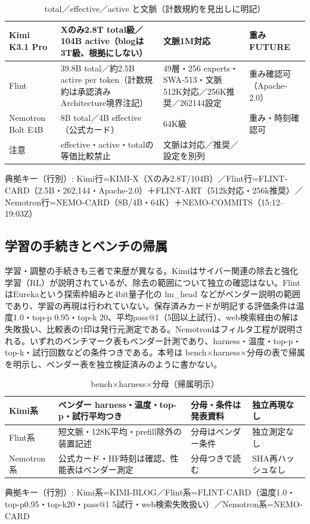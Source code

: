 \documentclass[lualatex,a4paper,10pt]{jlreq}
\begin{document}
\begin{table}[htbp]\centering\footnotesize
\caption{total／effective／active と文脈（計数規約を見出しに明記）}
\begin{tabularx}{0.96\linewidth}{@{}lXXX@{}}
\toprule
Kimi K3.1 Pro & Xのみ2.8T total級／104B active（blogは3T級、根拠にしない） & 文脈1M対応 & 重みFUTURE \\
\midrule
Flint & 39.8B total／約2.5B active per token（計数規約は承認済みArchitecture境界注記） & 49層・256 experts・SWA-513・文脈512K対応／256K推奨／262144設定 & 重み確認可（Apache-2.0） \\
Nemotron Bolt E4B & 8B total／4B effective（公式カード） & 64K級 & 重み・時刻確認可 \\
注意 & effective・active・totalの等価比較禁止 & 文脈は対応／推奨／設定を別列 &  \\
\bottomrule
\end{tabularx}
{\scriptsize\color{SurveyMuted} 典拠キー（行別）: Kimi行=KIMI-X（Xのみ2.8T/104B）／Flint行=FLINT-CARD（2.5B・262,144・Apache-2.0）＋FLINT-ART（512k対応・256k推奨）／Nemotron行=NEMO-CARD（8B/4B・64K）＋NEMO-COMMITS（15:12–19:03Z）\par}
\end{table}


\subsection*{学習の手続きとベンチの帰属}


学習・調整の手続きも三者で来歴が異なる。Kimiはサイバー関連の除去と強化学習（RL）が説明されているが、除去の範囲について独立の確認はない。FlintはEurekaという探索枠組みと4bit量子化の lm\_head などがベンダー説明の範囲であり、学習の再現は行われていない。保存済みカードが明記する評価条件は温度1.0・top-p 0.95・top-k 20、平均pass@1（5回以上試行）、web検索経由の解は失敗扱い、比較表の†印は発行元測定である。Nemotronはフィルタ工程が説明される。いずれのベンチマーク表もベンダー計測であり、harness・温度・top-p・top-k・試行回数などの条件つきである。本号は bench×harness×分母の表で帰属を明示し、ベンダー表を独立検証済みのように書かない。


\begin{table}[htbp]\centering\footnotesize
\caption{bench×harness×分母（帰属明示）}
\begin{tabularx}{0.96\linewidth}{@{}lXXX@{}}
\toprule
Kimi系 & ベンダー harness・温度・top-p・試行平均つき & 分母・条件は発表資料 & 独立再現なし \\
\midrule
Flint系 & 短文脈・128K平均・prefill除外の装置記述 & 分母はベンダー条件 & 独立測定なし \\
Nemotron系 & 公式カード・HF時刻は確認、性能表はベンダー測定 & 分母つきで読む & SHA再ハッシュなし \\
\bottomrule
\end{tabularx}
{\scriptsize\color{SurveyMuted} 典拠キー（行別）: Kimi系=KIMI-BLOG／Flint系=FLINT-CARD（温度1.0・top-p0.95・top-k20・pass@1 5試行・web検索失敗扱い）／Nemotron系=NEMO-CARD\par}
\end{table}
\end{document}
